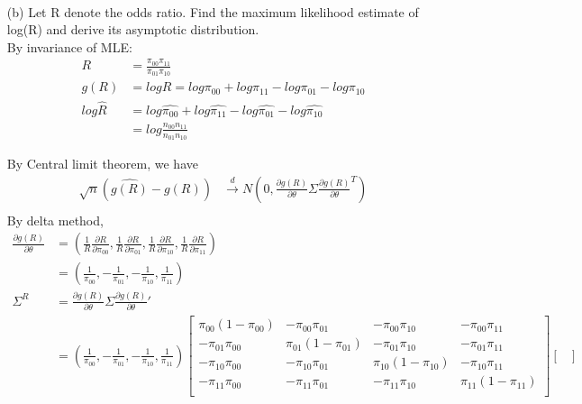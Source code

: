 \begin{itemize}
\begin{align*}
	\end{align*}
	\item[(b)] Let R denote the odds ratio. Find the maximum likelihood estimate of log(R) and
	derive its asymptotic distribution.\\
	By invariance of MLE:
	\begin{align*}
		R & =  \frac{\pi_{00}\pi_{11}}{\pi_{01}\pi_{10}}\\
		g(R) &= log R = log \pi_{00} + log \pi_{11}- log \pi_{01}- log \pi_{10}\\
		log \hat{R} & = log \hat{\pi_{00}} + log \hat{\pi_{11}}- log \hat{\pi_{01}}- log \hat{\pi_{10}}\\
		&= log \frac{n_{00}n_{11}}{n_{01}n_{10}}
	\end{align*}
	
	By Central limit theorem, we have 
	\begin{align*}
		\sqrt{n} \left(\hat{g(R)} - g(R) \right) & \xrightarrow[]{d} N \left(0, \frac{\partial g(R)}{\partial \theta} \Sigma   \frac{\partial g(R)}{\partial \theta}^T \right) \\
	\end{align*}
	By delta method,
	\begin{align*}
		\frac{\partial g(R)}{\partial \theta} &= \left(
		\frac{1}{R} \frac{\partial R}{\partial \pi_{00}} ,  \frac{1}{R}\frac{\partial R}{\partial \pi_{01}},   \frac{1}{R}\frac{\partial R}{\partial \pi_{10}} ,  \frac{1}{R} \frac{\partial R}{\partial \pi_{11}} \right)\\
		& = \left( \frac{1}{\pi_{00}},  -\frac{1}{\pi_{01}},  -\frac{1}{\pi_{10}}, \frac{1}{\pi_{11}} \right)\\
		\Sigma^{R} &= \frac{\partial g(R)}{\partial \theta} \Sigma \frac{\partial g(R)}{\partial \theta}' \\
		&= \left( \frac{1}{\pi_{00}},  -\frac{1}{\pi_{01}},  -\frac{1}{\pi_{10}}, \frac{1}{\pi_{11}} \right) \begin{bmatrix}
			\pi_{00}(1-\pi_{00}) &  -\pi_{00}\pi_{01}&  -\pi_{00}\pi_{10} &  -\pi_{00}\pi_{11}\\
			-\pi_{01}\pi_{00} & \pi_{01}(1-\pi_{01}) & -\pi_{01}\pi_{10}   & -\pi_{01}\pi_{11}  \\
			-\pi_{10}\pi_{00} & -\pi_{10}\pi_{01} &  \pi_{10}(1-\pi_{10})  & -\pi_{10}\pi_{11}  \\
			-\pi_{11}\pi_{00} &  -\pi_{11}\pi_{01} & -\pi_{11}\pi_{10}   & \pi_{11}(1-\pi_{11})  \\
		\end{bmatrix} \begin{bmatrix}

\end{bmatrix}
\end{align*}
\end{itemize}
